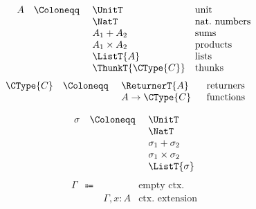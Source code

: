 \begin{minipage}{0.48\textwidth}
  \[
    \begin{array}{rcll}
           A    & \Coloneqq\ & \UnitT                 & \text{unit} \\
                &            & \NatT                  & \text{nat.\ numbers} \\
                &            & A_1 + A_2              & \text{sums} \\
                &            & A_1 \times A_2         & \text{products} \\
                &            & \ListT{A}              & \text{lists} \\
                &            & \ThunkT{\CType{C}}     & \text{thunks}
   \end{array}
  \]
  \[
    \begin{array}{rcll}
      \CType{C} & \Coloneqq\ & \ReturnerT{A}   & \text{\; returners \phantom{aaa}} \\
                &            & A \to \CType{C} & \text{\; functions}
    \end{array}
  \]
\end{minipage}
\begin{minipage}{0.48\textwidth}
  \[
    \begin{array}{rcll}
      \sigma    & \Coloneqq\ & \UnitT                   \\
                &            & \NatT                    \\
                &            & \sigma_1 + \sigma_2      \\
                &            & \sigma_1 \times \sigma_2 \\
                &            & \ListT{\sigma}
    \end{array}
  \]
  \[
    \begin{array}{rcll}
      \Gamma  & \Coloneqq\ &               & \text{empty ctx.} \\
              &            & \Gamma, x : A & \text{ctx.\ extension}
    \end{array}
  \]
\end{minipage}
